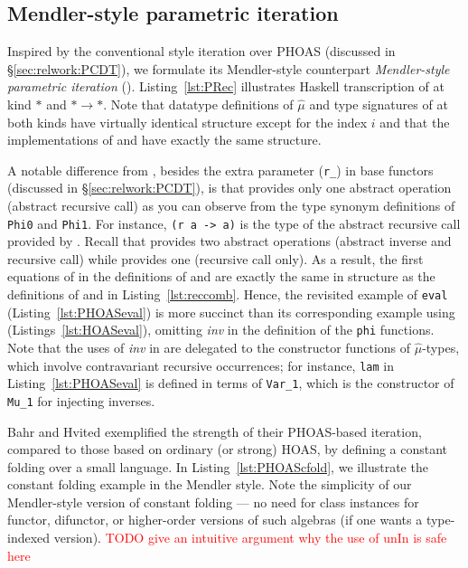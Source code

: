 \subsection{Mendler-style parametric iteration}
\label{sec:ongoing:mphit}
Inspired by the conventional style iteration over PHOAS \cite{BahHvi12}
(discussed in \S\ref{sec:relwork:PCDT}), we formulate its Mendler-style
counterpart \emph{Mendler-style parametric iteration} (\mphit{}).
Listing~\ref{lst:PRec} illustrates Haskell transcription of \mphit{}
at kind $*$ and $*\to*$. Note that datatype definitions of $\hat\mu$ and
type signatures of \mphit{} at both kinds have virtually identical structure
except for the index $i$ and that the implementations of \mphit{*} and
\mphit{*\to*} have exactly the same structure.

A notable difference from \msfit{},
besides the extra parameter (\lstinline{r_}) in base functors
(discussed in \S\ref{sec:relwork:PCDT}), is that \mphit{} provides only one
abstract operation (abstract recursive call) as you can observe from
the type synonym definitions of \lstinline{Phi0} and \lstinline{Phi1}.
For instance, \lstinline{(r a -> a)} is the type of
the abstract recursive call provided by \mphit{*}.
Recall that \msfit{} provides two abstract operations (abstract inverse
and recursive call) while \MIt{} provides one (recursive call only).
As a result, the first equations of \mphit{} in the definitions of \mphit{*}
and \mphit{*\to*} are exactly the same in structure as the definitions of
\MIt{*} and \MIt{*\to*} in Listing~\ref{lst:reccomb}. Hence, the revisited
example of \lstinline{eval} (Listing~\ref{lst:PHOASeval}) is more succinct
than its corresponding example using \msfit{} (Listings~\ref{lst:HOASeval}),
omitting \textit{inv} in the definition of the \lstinline{phi} functions.
Note that the uses of \textit{inv} in \mphit{} are delegated to
the constructor functions of $\hat\mu$-types, which involve
contravariant recursive occurrences; for instance, \lstinline{lam}
in Listing~\ref{lst:PHOASeval} is defined in terms of \lstinline{Var_1},
which is the constructor of \lstinline{Mu_1} for injecting inverses.

Bahr and Hvited \cite{BahHvi12} exemplified the strength of their PHOAS-based
iteration, compared to those \cite{FegShe96,bgb,AhnShe11} based on ordinary
(or strong) HOAS, by defining a constant folding over a small language.
In Listing~\ref{lst:PHOAScfold}, we illustrate the constant folding example
in the Mendler style. Note the simplicity of our Mendler-style version of
constant folding --- no need for class instances for functor,
difunctor, or higher-order versions of such algebras (if one wants a
type-indexed version).
\textcolor{red}{TODO give an intuitive argument
	why the use of unIn is safe here}

